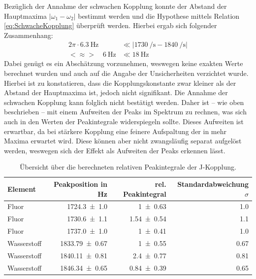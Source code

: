 Bezüglich der Annahme der schwachen Kopplung konnte der Abstand der Hauptmaxima $\vert \omega_1 - \omega_2 \vert$ bestimmt werden und die Hypothese mittels Relation \eqref{eq:SchwacheKopplung} überprüft werden.
Hierbei ergab sich folgender Zusammenhang:
\begin{align*}
    2 \pi \cdot \SI{6.3}{\hertz} &\ll \vert \SI{1730}{\per \second} - \SI{1840}{\per \second} \vert \\
    <\approx > \quad \SI{6}{\hertz} &\ll \SI{18}{\hertz}
\end{align*}
Dabei genügt es ein Abschätzung vorzunehmen, weswegen keine exakten Werte berechnet wurden und auch auf die Angabe der Unsicherheiten verzichtet wurde.
Hierbei ist zu konstatieren, dass die Kopplungskonstante zwar kleiner als der Abstand der Hauptmaxima ist, jedoch nicht signifikant.
Die Annahme der schwachen Kopplung kann folglich nicht bestätigt werden.
Daher ist -- wie oben beschrieben -- mit einem Aufweiten der Peaks im Spektrum zu rechnen, was sich auch in den Werten der Peakintegrale widerspiegeln sollte.
Dieses Aufweiten ist erwartbar, da bei stärkere Kopplung eine feinere Aufspaltung der in mehr Maxima erwartet wird.
Diese können aber nicht zwangsläufig separat aufgelöst werden, weswegen sich der Effekt als Aufweiten der Peaks erkennen lässt.
\begin{table}[H]
    \centering
    \caption{Übersicht über die berechneten relativen Peakintegrale der J-Kopplung.}
    \begin{tabular}{|l||r|r|r|} \hline
        Element & Peakposition in \si{\hertz} & rel. Peakintegral & Standardabweichung $\sigma$ \\ \hline \hline
        Fluor & \SI{1724.3 \pm 1.0}{} & \SI{1 \pm 0.63}{} & \SI{1.0}{}\\ \hline
        Fluor & \SI{1730.6 \pm 1.1}{}& \SI{1.54 \pm 0.54}{} & \SI{1.1}{}\\ \hline
        Fluor & \SI{1737.0 \pm 1.0}{} &\SI{1 \pm 0.41}{}& \SI{1.0}{}\\ \hline \hline
        Wasserstoff & \SI{1833.79 \pm 0.67}{} & \SI{1 \pm 0.55}{}& \SI{0.67}{}\\ \hline
        Wasserstoff & \SI{1840.11 \pm 0.81}{} & \SI{2.4 \pm 0.77}{}& \SI{0.81}{}\\ \hline
        Wasserstoff & \SI{1846.34 \pm 0.65}{}  & \SI{0.84 \pm 0.39}{}& \SI{0.65}{}\\ \hline
    \end{tabular} 
    \label{tab:Peaksintens} 
\end{table}
